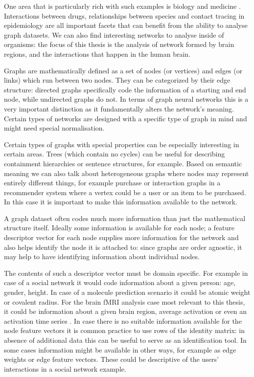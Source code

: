 	One area that is particularly rich with such examples is biology and medicine \cite{zhang2021graph}. Interactions between drugs, relationships between species and contact tracing in epidemiology are all important facets that can benefit from the ability to analyse graph datasets. We can also find interesting networks to analyse inside of organisms: the focus of this thesis is the analysis of network formed by brain regions, and the interactions that happen in the human brain.
	
	Graphs are mathematically defined as a set of nodes (or vertices) and edges (or links) which run between two nodes. They can be categorized by their edge structure: directed graphs specifically code the information of a starting and end node, while undirected graphs do not. In terms of graph neural networks this is a very important distinction as it fundamentally alters the network's meaning. Certain types of networks are designed with a specific type of graph in mind and might need special normalisation.
	
	Certain types of graphs with special properties can be especially interesting in certain areas. Trees (which contain no cycles) can be useful for describing containment hierarchies or sentence structures, for example. Based on semantic meaning we can also talk about heterogeneous graphs where nodes may represent entirely different things, for example purchase or interaction graphs in a recommender system where a vertex could be a user or an item to be purchased. In this case it is important to make this information available to the network.
	
	A graph dataset often codes much more information than just the mathematical structure itself. Ideally some information is available for each node; a feature descriptor vector for each node supplies more information for the network and also helps identify the node it is attached to: since graphs are order agnostic, it may help to have identifying information about individual nodes. 
	
	The contents of such a descriptor vector must be domain specific. For example in case of a social network it would code information about a given person: age, gender, height. In case of a molecule prediction scenario it could be atomic weight or covalent radius. For the brain fMRI analysis case most relevant to this thesis, it could be information about a given brain region, average activation or even an activation time series \cite{VAROQUAUX2013405}. In case there is no suitable information available for the node feature vectors it is common practice to use rows of the identity matrix: in absence of additional data this can be useful to serve as an identification tool. In some cases information might be available in other ways, for example as edge weights or edge feature vectors. These could be descriptive of the users' interactions in a social network example.
	
